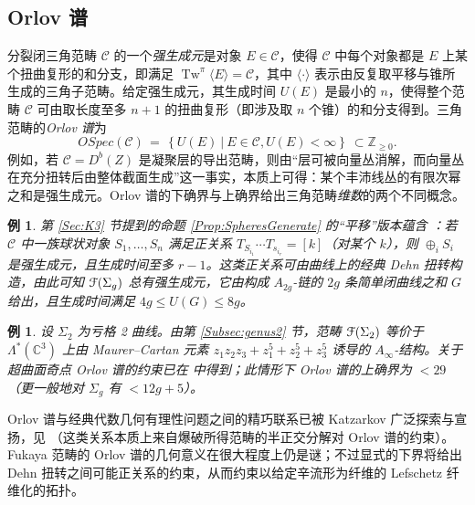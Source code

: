 \documentclass[11pt,a4paper]{article}
\numberwithin{equation}{section}
\newtheorem{Example}[thm]{例}
\newcommand{\bZ}{\mathbb{Z}}
\newcommand{\bC}{\mathbb{C}}
\newcommand{\scrF}{\EuScript{F}}
\newcommand{\CC}{\mathcal{C}}
\newcommand{\Tw}{\operatorname{Tw}}
\begin{document}
\subsection{Orlov 谱} 分裂闭三角范畴 $\CC$ 的一个\emph{强生成元}是对象 $E \in \CC$，使得 $\CC$ 中每个对象都是 $E$ 上某个扭曲复形的和分支，即满足 $\Tw^{\pi}\langle E\rangle = \CC$，其中 $\langle \cdot \rangle$ 表示由反复取平移与锥所生成的三角子范畴。给定强生成元，其生成时间 $U(E)$ 是最小的 $n$，使得整个范畴 $\CC$ 可由取长度至多 $n+1$ 的扭曲复形（即涉及取 $n$ 个锥）的和分支得到。三角范畴的\emph{Orlov 谱}为
\[
OSpec(\CC) \, = \, \left\{U(E) \ | \ E \in \CC, U(E) < \infty \right\} \ \subset \bZ_{\geq 0}.
\]
例如，若 $\CC = D^b(Z)$ 是凝聚层的导出范畴，则由“层可被向量丛消解，而向量丛在充分扭转后由整体截面生成”这一事实，本质上可得：某个丰沛线丛的有限次幂之和是强生成元。Orlov 谱的下确界与上确界给出三角范畴\emph{维数}的两个不同概念。


\begin{Example} 第 \ref{Sec:K3} 节提到的命题 \ref{Prop:SpheresGenerate} 的“平移”版本蕴含 \cite{BallardEtAl}：若 $\CC$ 中一族球状对象 $S_1,\ldots, S_n$ 满足正关系 $T_{S_{i_1}}\cdots T_{s_{i_r}} = [k]$（对某个 $k$），则 $\oplus_i S_i$ 是强生成元，且生成时间至多 $r-1$。这类正关系可由曲线上的经典 Dehn 扭转构造，由此可知 $\scrF(\Sigma_g)$ 总有强生成元，它由构成 $A_{2g}$-链的 $2g$ 条简单闭曲线之和 $G$ 给出，且生成时间满足 $4g \leq U(G) \leq 8g$。\end{Example}


\begin{Example}
设 $\Sigma_2$ 为亏格 2 曲线。由第 \ref{Subsec:genus2} 节，范畴 $\scrF(\Sigma_2)$ 等价于 $\Lambda^*(\bC^3)$ 上由 Maurer--Cartan 元素 $z_1z_2z_3 + z_1^5+z_2^5+z_3^5$ 诱导的 $A_{\infty}$-结构。关于超曲面奇点 Orlov 谱的约束已在 \cite{BallardEtAl} 中得到；此情形下 Orlov 谱的上确界为 $< 29$（更一般地对 $\Sigma_g$ 有 $<12g+5$）。
\end{Example}

Orlov 谱与经典代数几何有理性问题之间的精巧联系已被 Katzarkov 广泛探索与宣扬，见 \cite{Katzarkov,BallardEtAl}（这类关系本质上来自爆破所得范畴的半正交分解对 Orlov 谱的约束）。Fukaya 范畴的 Orlov 谱的几何意义在很大程度上仍是谜；不过显式的下界将给出 Dehn 扭转之间可能正关系的约束，从而约束以给定辛流形为纤维的 Lefschetz 纤维化的拓扑。
\end{document}

